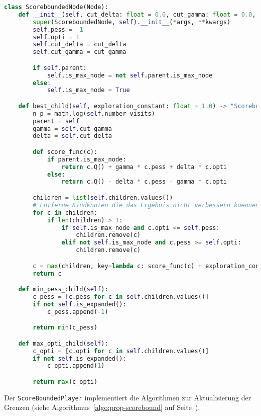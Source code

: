 \begin{lstlisting}[language=Python,label={lst:scorebounded-node}]
class ScoreboundedNode(Node):
    def __init__(self, cut_delta: float = 0.0, cut_gamma: float = 0.0, *args, **kwargs):
        super(ScoreboundedNode, self).__init__(*args, **kwargs)
        self.pess = -1
        self.opti = 1
        self.cut_delta = cut_delta
        self.cut_gamma = cut_gamma

        if self.parent:
            self.is_max_node = not self.parent.is_max_node
        else:
            self.is_max_node = True

    def best_child(self, exploration_constant: float = 1.0) -> "ScoreboundedNode":
        n_p = math.log(self.number_visits)
        parent = self
        gamma = self.cut_gamma
        delta = self.cut_delta

        def score_func(c):
            if parent.is_max_node:
                return c.Q() + gamma * c.pess + delta * c.opti
            else:
                return c.Q() - delta * c.pess - gamma * c.opti

        children = list(self.children.values())
        # Entferne Kindknoten die das Ergebnis nicht verbessern koennen
        for c in children:
            if len(children) > 1:
                if self.is_max_node and c.opti <= self.pess:
                    children.remove(c)
                elif not self.is_max_node and c.pess >= self.opti:
                    children.remove(c)

        c = max(children, key=lambda c: score_func(c) + exploration_constant * math.sqrt(n_p / c.number_visits))
        return c

    def min_pess_child(self):
        c_pess = [c.pess for c in self.children.values()]
        if not self.is_expanded():
            c_pess.append(-1)

        return min(c_pess)

    def max_opti_child(self):
        c_opti = [c.opti for c in self.children.values()]
        if not self.is_expanded():
            c_opti.append(1)

        return max(c_opti)
\end{lstlisting}

Der \verb|ScoreBoundedPlayer| implementiert die Algorithmen zur Aktualisierung der Grenzen (siehe Algorithmus~\ref{algo:prop-scorebound} auf Seite~\pageref{algo:prop-scorebound}).

